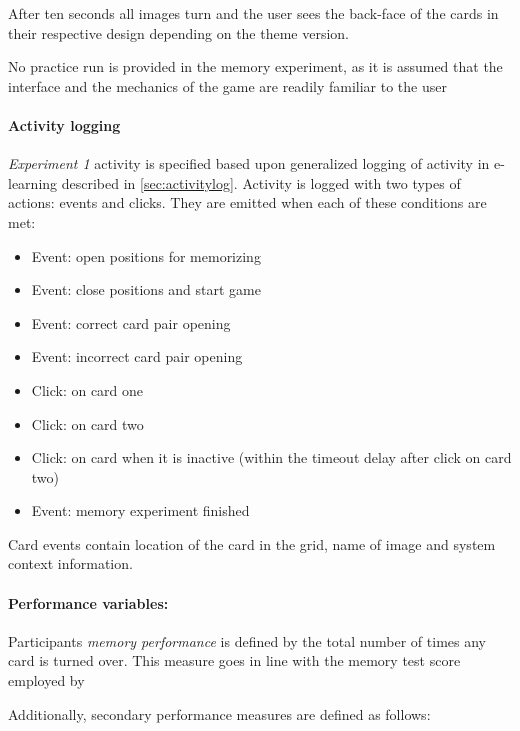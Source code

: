 		After ten seconds all images turn and the user sees the back-face of the cards in their respective design depending on the theme version.
		
		No practice run is provided in the memory experiment, as it is assumed that the interface and the mechanics of the game are readily familiar to the user 
		
		\paragraph{Activity logging}
		
		\textit{Experiment 1} activity is specified based upon generalized logging of activity in e-learning described in \ref{sec:activitylog}. Activity is logged with two types of actions: events and clicks. They are emitted when each of these conditions are met:
		
		\begin{itemize}
			\item Event: open positions for memorizing
			\item Event: close positions and start game
			\item Event: correct card pair opening
			\item Event: incorrect card pair opening
			\item Click: on card one
			\item Click: on card two
			\item Click: on card when it is inactive (within the timeout delay after click on card two)
			\item Event: memory experiment finished
		\end{itemize}
		
		Card events contain location of the card in the grid, name of image and system context information.
		
		\paragraph{Performance variables:} \label{sec:memory-parameters} Participants \textit{memory performance} is defined by the total number of times any card is turned over. This measure goes in line with the memory test score employed by \cite{McBurney1997}
		
		Additionally, secondary performance measures are defined as follows:
		
